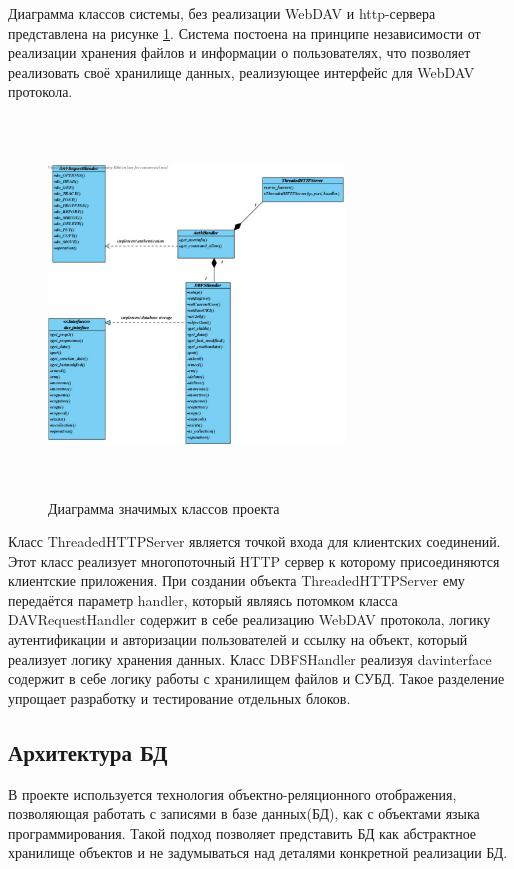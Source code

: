 \documentclass[utf8,usehyperref,12pt]{G7-32}
\begin{document}
 Диаграмма классов системы, без реализации WebDAV и http-сервера представлена на рисунке \ref{fig:davstorage}. Система постоена на принципе независимости от реализации хранения файлов и информации о пользователях, что позволяет реализовать своё хранилище данных, реализующее интерфейс для WebDAV протокола.
 
\begin{figure}[h]
   \centering%
   \includegraphics[height=100mm, width=0.7\textwidth, clip, keepaspectratio]{pictures/davstorage}
   \caption{Диаграмма значимых классов проекта}\label{fig:davstorage}
 \end{figure}
 
Класс ThreadedHTTPServer является точкой входа для клиентских соединений. Этот класс реализует многопоточный HTTP сервер к которому присоединяются клиентские приложения. При создании объекта ThreadedHTTPServer ему передаётся параметр handler, который являясь потомком класса DAVRequestHandler содержит в себе реализацию WebDAV протокола, логику аутентификации и авторизации пользователей и ссылку на объект, который реализует логику хранения данных. Класс DBFSHandler реализуя davinterface содержит в себе логику работы с хранилищем файлов и СУБД. Такое разделение упрощает разработку и тестирование отдельных блоков. 

 
\subsection{Архитектура БД}

В проекте используется технология объектно-реляционного отображения, позволяющая работать с записями в базе данных(БД), как с объектами языка программирования. Такой подход позволяет представить БД как абстрактное хранилище объектов и не задумываться над деталями конкретной реализации БД.
\end{document}
